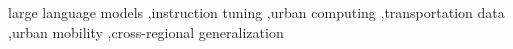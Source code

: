 \documentclass[a4paper,fleqn]{cas-sc}
\begin{document}
\begin{keywords}
large language models \sep instruction tuning \sep urban computing \sep transportation data \sep urban mobility \sep cross-regional generalization
\end{keywords}

\maketitle



\end{document}
